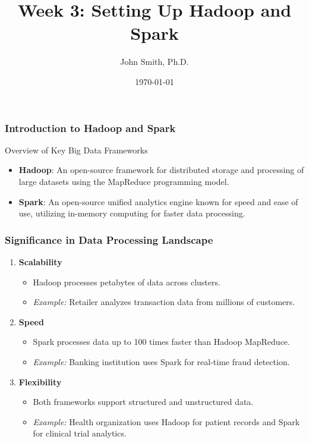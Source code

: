 \documentclass[aspectratio=169]{beamer}
\title[Hadoop and Spark]{Week 3: Setting Up Hadoop and Spark}
\author[J. Smith]{John Smith, Ph.D.}
\institute[University Name]{
  Department of Computer Science\\
  University Name\\
  \vspace{0.3cm}
  Email: email@university.edu\\
  Website: www.university.edu
}
\date{\today}
\begin{document}
\frame{\titlepage}

\begin{frame}[fragile]
    \frametitle{Introduction to Hadoop and Spark}
    \begin{block}{Overview of Key Big Data Frameworks}
        \begin{itemize}
            \item \textbf{Hadoop}: An open-source framework for distributed storage and processing of large datasets using the MapReduce programming model.
            \item \textbf{Spark}: An open-source unified analytics engine known for speed and ease of use, utilizing in-memory computing for faster data processing.
        \end{itemize}
    \end{block}
\end{frame}

\begin{frame}[fragile]
    \frametitle{Significance in Data Processing Landscape}
    \begin{enumerate}
        \item \textbf{Scalability}
            \begin{itemize}
                \item Hadoop processes petabytes of data across clusters.
                \item \textit{Example:} Retailer analyzes transaction data from millions of customers.
            \end{itemize}
        \item \textbf{Speed}
            \begin{itemize}
                \item Spark processes data up to 100 times faster than Hadoop MapReduce.
                \item \textit{Example:} Banking institution uses Spark for real-time fraud detection.
            \end{itemize}
        \item \textbf{Flexibility}
            \begin{itemize}
                \item Both frameworks support structured and unstructured data.
                \item \textit{Example:} Health organization uses Hadoop for patient records and Spark for clinical trial analytics.
            \end{itemize}
    \end{enumerate}
\end{frame}
\end{document}
